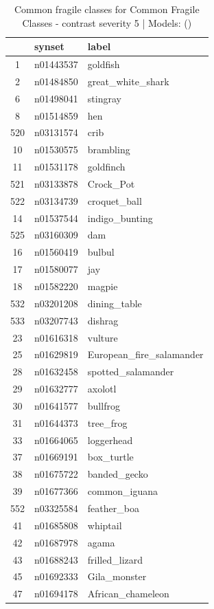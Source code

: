 \begin{table}
\caption{Common fragile classes for Common Fragile Classes - contrast severity 5 | Models: ()}
\label{tab:Common Fragile Classes - contrast severity 5_d41d8cd9}
\begin{tabular}{cll}
\toprule
 & synset & label \\
\midrule
1 & n01443537 & goldfish \\
2 & n01484850 & great_white_shark \\
6 & n01498041 & stingray \\
8 & n01514859 & hen \\
520 & n03131574 & crib \\
10 & n01530575 & brambling \\
11 & n01531178 & goldfinch \\
521 & n03133878 & Crock_Pot \\
522 & n03134739 & croquet_ball \\
14 & n01537544 & indigo_bunting \\
525 & n03160309 & dam \\
16 & n01560419 & bulbul \\
17 & n01580077 & jay \\
18 & n01582220 & magpie \\
532 & n03201208 & dining_table \\
533 & n03207743 & dishrag \\
23 & n01616318 & vulture \\
25 & n01629819 & European_fire_salamander \\
28 & n01632458 & spotted_salamander \\
29 & n01632777 & axolotl \\
30 & n01641577 & bullfrog \\
31 & n01644373 & tree_frog \\
33 & n01664065 & loggerhead \\
37 & n01669191 & box_turtle \\
38 & n01675722 & banded_gecko \\
39 & n01677366 & common_iguana \\
552 & n03325584 & feather_boa \\
41 & n01685808 & whiptail \\
42 & n01687978 & agama \\
43 & n01688243 & frilled_lizard \\
45 & n01692333 & Gila_monster \\
47 & n01694178 & African_chameleon \\

\end{tabular}
\end{table}
